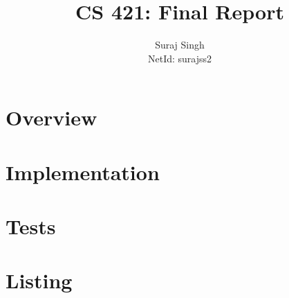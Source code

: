 \documentclass[letterpaper, 11pt]{article}
\title{CS 421: Final Report}
\author{Suraj Singh \\ NetId: surajss2 }
\begin{document}
\maketitle

\section{Overview}\label{sec:overview}
\section{Implementation}\label{sec:impl}
\section{Tests}\label{sec:tests}


\section{Listing}\label{sec:code}
\end{document}
